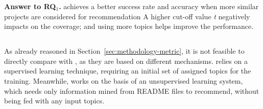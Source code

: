 


\begin{tcolorbox}[boxrule=0.86pt,left=0.3em, right=0.3em,top=0.1em, bottom=0.05em]
\textbf{Answer to RQ$_1$.} \TFa achieves a better success rate and accuracy when more similar projects are considered for recommendation
A higher cut-off value \emph{t} negatively impacts on the coverage; and using more topics helps improve the performance.
\end{tcolorbox}


%

\subsection{\rqsecond} \label{sec:EXP3}

As already reasoned in Section~\ref{sec:methodology-metric}, it is not feasible to directly compare \TF with \MNB, as they are based on different mechanisms. \TF relies on a supervised learning technique, requiring an initial set of assigned topics for the training. Meanwhile, \MNB works on the basis of an unsupervised learning system, which needs only information mined from README files to recommend, without being fed with any input topics. %

